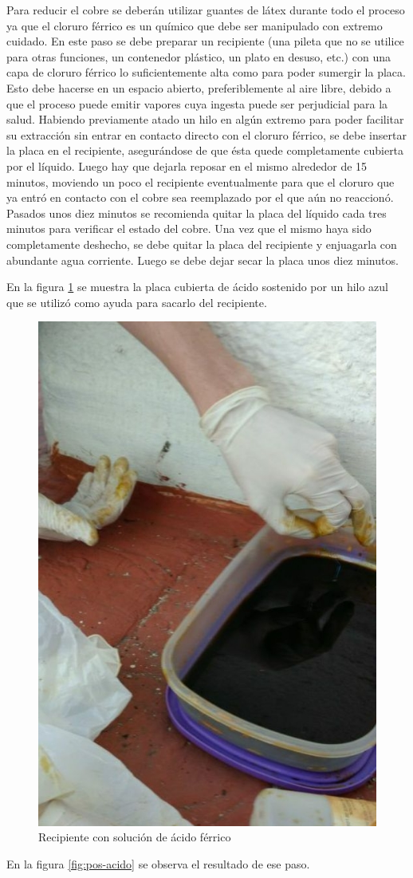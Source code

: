 Para reducir el cobre se deberán utilizar guantes de látex durante todo el proceso ya que el cloruro férrico es un químico que debe ser manipulado con extremo cuidado.
En este paso se debe preparar un recipiente (una pileta que no se utilice para otras funciones, un contenedor plástico, un plato en desuso, etc.) con una capa de cloruro férrico lo suficientemente alta como para poder sumergir la placa. Esto debe hacerse en un espacio abierto, preferiblemente al aire libre, debido a que el proceso puede emitir vapores cuya ingesta puede ser perjudicial para la salud. Habiendo previamente atado un hilo en algún extremo para poder facilitar su extracción sin entrar en contacto directo con el cloruro férrico, se debe insertar la placa en el recipiente, asegurándose de que ésta quede completamente cubierta por el líquido. Luego hay que dejarla reposar en el mismo alrededor de 15 minutos, moviendo un poco el recipiente eventualmente para que el cloruro que ya entró en contacto con el cobre sea reemplazado por el que aún no reaccionó. Pasados unos diez minutos se recomienda quitar la placa del líquido cada tres minutos para verificar el estado del cobre. Una vez que el mismo haya sido completamente deshecho, se debe quitar la placa del recipiente y enjuagarla con abundante agua corriente. Luego se debe dejar secar la placa unos diez minutos.

En la figura \ref{fig:acido} se muestra la placa cubierta de ácido sostenido por un hilo azul que se utilizó como ayuda para sacarlo del recipiente.

\begin{figure}[ht!]
	\centering
	\includegraphics[width=0.3\linewidth]{imagenes/pcbeando/acido.jpeg}
	\caption{Recipiente con solución de ácido férrico}
	\label{fig:acido}
\end{figure}


En la figura \ref{fig:pos-acido} se observa el resultado de ese paso.

